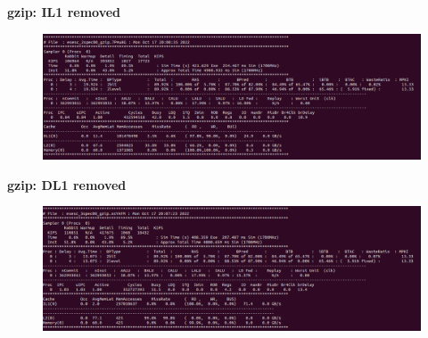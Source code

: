 \documentclass[12pt]{article}
\begin{document}
\textbf{gzip: IL1 removed}
\begin{figure}[h!]
	\includegraphics[scale=0.3]{img/gzip2.png}
\end{figure}

\textbf{gzip: DL1 removed}
\begin{figure}[h!]
	\includegraphics[scale=0.3]{img/gzip3.png}
\end{figure}
\end{document}
